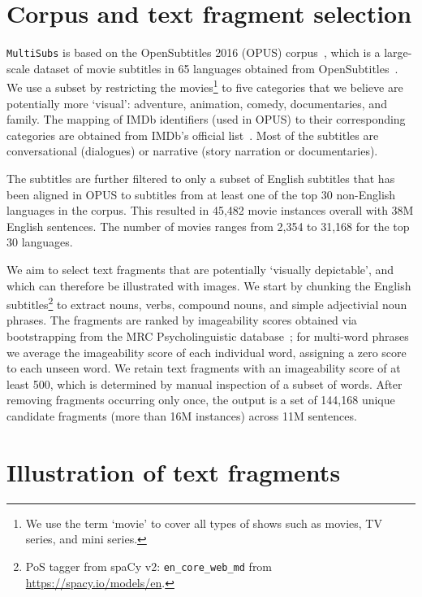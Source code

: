 \documentclass[twocolumn]{svjour3}          \smartqed  \usepackage{graphicx}
\newcommand{\multisubs}{\texttt{MultiSubs}\xspace}
\begin{document}
\section{Corpus and text fragment selection}
\label{sec:subtitles}

\multisubs is based on the OpenSubtitles 2016 (OPUS) corpus~\cite{LisonTiedemann:2016}, which is a large-scale dataset of movie subtitles in 65 languages obtained from OpenSubtitles~\cite{Opensubtitles:2019}. We use a subset by restricting the movies\footnote{We use the term `movie' to cover all types of shows such as movies, TV series, and mini series.} 
to five categories that we believe are potentially more `visual': adventure, animation, comedy, documentaries, and family. The mapping of IMDb identifiers (used in OPUS) to their corresponding categories are obtained from IMDb's official list~\cite{IMDb:2019}. Most of the subtitles are conversational (dialogues) or narrative (story narration or documentaries). 

The subtitles are further filtered to only a subset of English subtitles that has been aligned in OPUS to subtitles from at least one of the top 30 non-English languages in the corpus. This resulted in 45,482 movie instances overall with 38M English sentences. The number of movies ranges from 2,354 to 31,168 for the top 30 languages.



We aim to select text fragments that are potentially `visually depictable', and which can therefore be illustrated with images. We start by chunking the English subtitles\footnote{PoS tagger from spaCy v2: \texttt{en\_core\_web\_md} from \url{https://spacy.io/models/en}.} to extract nouns, verbs, compound nouns, and simple adjectivial noun phrases. The fragments are ranked by imageability scores obtained via bootstrapping from the MRC Psycholinguistic database~\cite{PaetzoldSpecia:2016}; for multi-word phrases we average the imageability score of each individual word, assigning a zero score to each unseen word. We retain text fragments with an imageability score of at least 500, which is determined by manual inspection of a subset of words. After removing fragments occurring only once, the output is a set of 144,168 unique candidate fragments (more than 16M instances) across 11M sentences. 

\section{Illustration of text fragments}
\label{sec:phrase-illustration}
\end{document}
